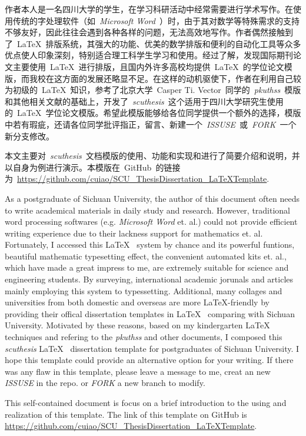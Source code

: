 \begin{CHSabstract}
	作者本人是一名四川大学的学生，在学习科研活动中经常需要进行学术写作。在使用传统的字处理软件（如~\emph{Microsoft\textsuperscript{\textregistered} Word}~）时，由于其对数学等特殊需求的支持不够友好，因此往往会遇到各种各样的问题，无法高效地写作。作者偶然接触到了~\LaTeX~排版系统，其强大的功能、优美的数学排版和便利的自动化工具等众多优点使人印象深刻，特别适合理工科学生学习和使用。经过了解，发现国际期刊论文主要使用~\LaTeX~进行排版，且国内外许多高校均提供~\LaTeX~的学位论文模版，而我校在这方面的发展还略显不足。在这样的动机驱使下，作者在利用自己较为初级的~\LaTeX~知识，参考了北京大学~Casper Ti. Vector~同学的~\emph{pkuthss}~模版和其他相关文献的基础上，开发了~\emph{scuthesis}~这个适用于四川大学研究生使用的~\LaTeX~学位论文模版。希望此模版能够给各位同学提供一个额外的选择，模版中若有瑕疵，还请各位同学批评指正，留言、新建一个~\emph{ISSUSE}~或~\emph{FORK}~一个新分支修改。

	本文主要对~\emph{scuthesis}~文档模版的使用、功能和实现和进行了简要介绍和说明，并以自身为例进行演示。本模版在~GitHub~的链接为~\url{https://github.com/cuiao/SCU_ThesisDissertation_LaTeXTemplate}.
\end{CHSabstract}

\begin{ENGabstract}
	As a postgraduate of Sichuan University, the author of this document often needs to write academical materials in daily study and research. However, traditional word processing softwares (e.g. \emph{Microsoft\textsuperscript{\textregistered} Word} et. al.) could not provide efficient writing experience due to their lackness support for mathematics et. al. Fortunately, I accessed this \LaTeX~ system by chance and its powerful funtions, beautiful mathematic typesetting effect, the convenient automated kits et. al., which have made a great impress to me, are extremely suitable for science and engineering students. By surveying, international academic jorunals and articles mainly employing this system to typessetting. Additional, many collages and universities from both domestic and overseas are more \LaTeX-friendly by providing their offical dissertation templates in \LaTeX~ comparing with Sichuan University. Motivated by these reasons, based on my kindergarten \LaTeX~ techniques and refering to the \emph{pkuthss} and other documents, I composed this \emph{scuthesis} \LaTeX~ dissertation template for postgraduates of Sichuan University. I hope this template could provide an alternative option for your writing. If there was any flaw in this template, please leave a message to me, creat an new \emph{ISSUSE} in the repo. or \emph{FORK} a new branch to modify.


	This self-contained document is focus on a brief introduction to the using and realization of this template. The link of this template on GitHub is \url{https://github.com/cuiao/SCU_ThesisDissertation_LaTeXTemplate}.
\end{ENGabstract}
